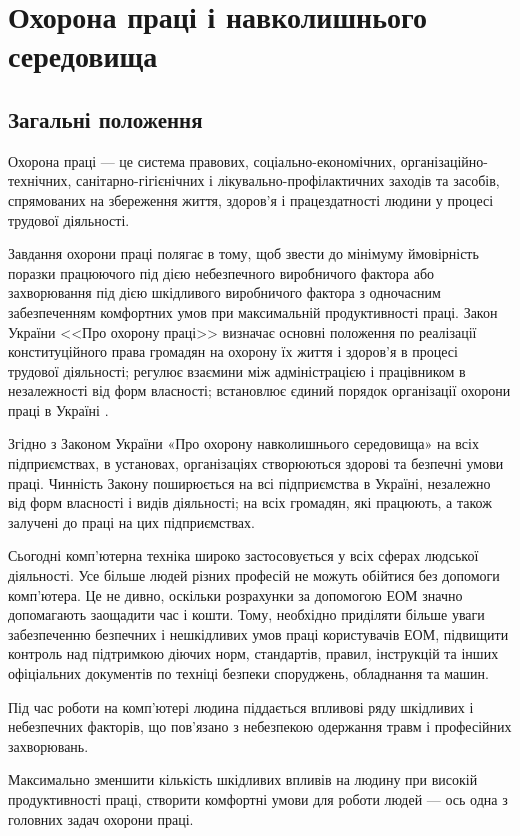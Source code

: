 \section{Охорона праці і навколишнього середовища}
\subsection{Загальні положення}
Охорона праці --- це система правових, соціально-економічних, організаційно-технічних, санітарно-гігієнічних і лікувально-профілактичних заходів та засобів, спрямованих на збереження життя, здоров’я і працездатності людини у процесі трудової діяльності.

Завдання охорони праці полягає в тому, щоб звести до мінімуму ймовірність поразки працюючого під дією небезпечного виробничого фактора або захворювання під дією шкідливого виробничого фактора з одночасним забезпеченням комфортних умов при максимальній продуктивності праці. Закон України <<Про охорону праці>> визначає основні положення по реалізації конституційного права громадян на охорону їх життя і здоров'я в процесі трудової діяльності; регулює взаємини між адміністрацією і працівником в незалежності від форм власності; встановлює єдиний порядок організації охорони праці в Україні \cite{ber1}. %

Згідно з Законом України «Про охорону навколишнього середовища» \cite{ber2} на всіх підприємствах, в установах, організаціях створюються здорові та безпечні умови праці. Чинність Закону поширюється на всі підприємства в Україні, незалежно від форм власності і видів діяльності; на всіх громадян, які працюють, а також залучені до праці на цих підприємствах. %

Сьогодні комп’ютерна техніка широко застосовується у всіх сферах людської діяльності. Усе більше людей різних професій не можуть обійтися без допомоги комп’ютера. Це не дивно, оскільки розрахунки за допомогою ЕОМ значно допомагають заощадити час і кошти. Тому, необхідно приділяти більше уваги забезпеченню безпечних і нешкідливих умов праці користувачів ЕОМ, підвищити контроль над підтримкою діючих норм, стандартів, правил, інструкцій та інших офіціальних документів по техніці безпеки споруджень, обладнання та машин.

Під час роботи на комп’ютері людина піддається впливові ряду шкідливих і небезпечних факторів, що пов’язано з небезпекою одержання травм і професійних захворювань.

Максимально зменшити кількість шкідливих впливів на людину при високій продуктивності праці, створити комфортні умови для роботи людей --- ось одна з головних задач охорони праці.

